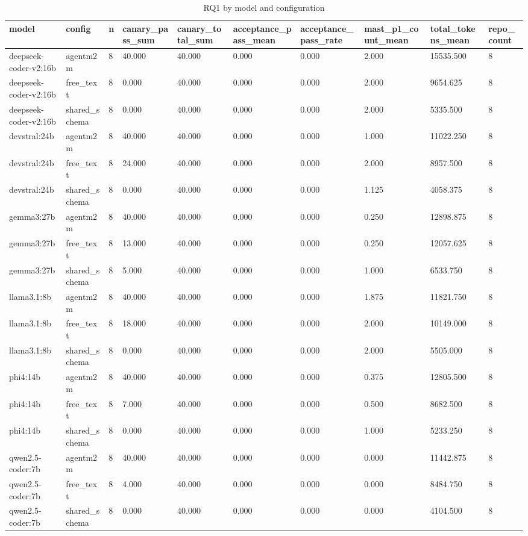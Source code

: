 \begin{table}[t]
\centering\small
\caption{RQ1 by model and configuration}\label{tab:rq1_by_model_config}
\begin{tabular}{llllllllll}
\toprule
model & config & n & canary\_pass\_sum & canary\_total\_sum & acceptance\_pass\_mean & acceptance\_pass\_rate & mast\_p1\_count\_mean & total\_tokens\_mean & repo\_count \\
\midrule
deepseek-coder-v2:16b & agentm2m & 8 & 40.000 & 40.000 & 0.000 & 0.000 & 2.000 & 15535.500 & 8 \\
deepseek-coder-v2:16b & free\_text & 8 & 0.000 & 40.000 & 0.000 & 0.000 & 2.000 & 9654.625 & 8 \\
deepseek-coder-v2:16b & shared\_schema & 8 & 0.000 & 40.000 & 0.000 & 0.000 & 2.000 & 5335.500 & 8 \\
devstral:24b & agentm2m & 8 & 40.000 & 40.000 & 0.000 & 0.000 & 1.000 & 11022.250 & 8 \\
devstral:24b & free\_text & 8 & 24.000 & 40.000 & 0.000 & 0.000 & 2.000 & 8957.500 & 8 \\
devstral:24b & shared\_schema & 8 & 0.000 & 40.000 & 0.000 & 0.000 & 1.125 & 4058.375 & 8 \\
gemma3:27b & agentm2m & 8 & 40.000 & 40.000 & 0.000 & 0.000 & 0.250 & 12898.875 & 8 \\
gemma3:27b & free\_text & 8 & 13.000 & 40.000 & 0.000 & 0.000 & 0.250 & 12057.625 & 8 \\
gemma3:27b & shared\_schema & 8 & 5.000 & 40.000 & 0.000 & 0.000 & 1.000 & 6533.750 & 8 \\
llama3.1:8b & agentm2m & 8 & 40.000 & 40.000 & 0.000 & 0.000 & 1.875 & 11821.750 & 8 \\
llama3.1:8b & free\_text & 8 & 18.000 & 40.000 & 0.000 & 0.000 & 2.000 & 10149.000 & 8 \\
llama3.1:8b & shared\_schema & 8 & 0.000 & 40.000 & 0.000 & 0.000 & 2.000 & 5505.000 & 8 \\
phi4:14b & agentm2m & 8 & 40.000 & 40.000 & 0.000 & 0.000 & 0.375 & 12805.500 & 8 \\
phi4:14b & free\_text & 8 & 7.000 & 40.000 & 0.000 & 0.000 & 0.500 & 8682.500 & 8 \\
phi4:14b & shared\_schema & 8 & 0.000 & 40.000 & 0.000 & 0.000 & 1.000 & 5233.250 & 8 \\
qwen2.5-coder:7b & agentm2m & 8 & 40.000 & 40.000 & 0.000 & 0.000 & 0.000 & 11442.875 & 8 \\
qwen2.5-coder:7b & free\_text & 8 & 4.000 & 40.000 & 0.000 & 0.000 & 0.000 & 8484.750 & 8 \\
qwen2.5-coder:7b & shared\_schema & 8 & 0.000 & 40.000 & 0.000 & 0.000 & 0.000 & 4104.500 & 8 \\
\bottomrule
\end{tabular}
\end{table}
